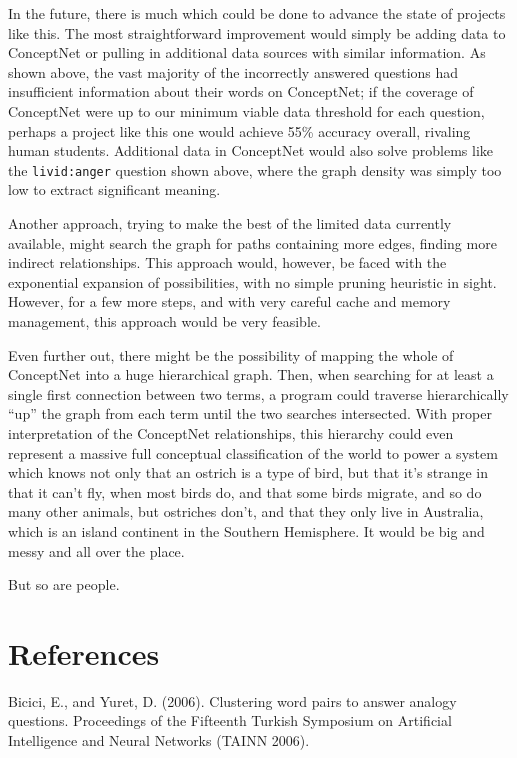 \documentclass[11pt]{article}
\begin{document}
In the future, there is much which could be done to advance the state of projects like this. The most straightforward improvement would simply be adding data to ConceptNet or pulling in additional data sources with similar information. As shown above, the vast majority of the incorrectly answered questions had insufficient information about their words on ConceptNet; if the coverage of ConceptNet were up to our minimum viable data threshold for each question, perhaps a project like this one would achieve 55\% accuracy overall, rivaling human students. Additional data in ConceptNet would also solve problems like the \verb|livid:anger| question shown above, where the graph density was simply too low to extract significant meaning.

Another approach, trying to make the best of the limited data currently available, might search the graph for paths containing more edges, finding more indirect relationships. This approach would, however, be faced with the exponential expansion of possibilities, with no simple pruning heuristic in sight. However, for a few more steps, and with very careful cache and memory management, this approach would be very feasible.

Even further out, there might be the possibility of mapping the whole of ConceptNet into a huge hierarchical graph. Then, when searching for at least a single first connection between two terms, a program could traverse hierarchically ``up'' the graph from each term until the two searches intersected. With proper interpretation of the ConceptNet relationships, this hierarchy could even represent a massive full conceptual classification of the world to power a system which knows not only that an ostrich is a type of bird, but that it's strange in that it can't fly, when most birds do, and that some birds migrate, and so do many other animals, but ostriches don't, and that they only live in Australia, which is an island continent in the Southern Hemisphere. It would be big and messy and all over the place.

But so are people.

\clearpage

\section*{References}

Bicici, E., and Yuret, D. (2006). Clustering word pairs to answer analogy questions. Proceedings of the Fifteenth Turkish Symposium on Artificial Intelligence and Neural Networks (TAINN 2006).
\end{document}
